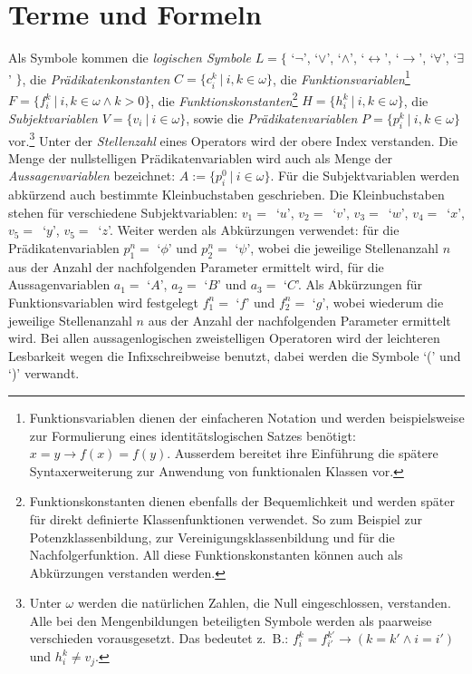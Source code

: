 \documentclass[a4paper,german,10pt,twoside]{book}
\theoremstyle{definition}
\theoremstyle{remark}
\begin{document}
\section{Terme und Formeln} \label{chapter3_section0} \hypertarget{chapter3_section0}{}
Als Symbole kommen die \emph{logischen Symbole} $L = \{$ \mbox{`$\neg$'}, \mbox{`$\vee$'}, \mbox{`$\wedge$'},             \mbox{`$\leftrightarrow$'}, \mbox{`$\rightarrow$'}, \mbox{`$\forall$'}, \mbox{`$\exists$'} $\}$, die 
\emph{Pr{\"a}dikatenkonstanten} $C = \{c^k_i~|~i, k \in \omega\}$, die 
\emph{Funktionsvariablen}\footnote{Funktionsvariablen dienen der einfacheren Notation und werden beispielsweise zur Formulierung eines identit{\"a}tslogischen Satzes ben{\"o}tigt: $x = y \rightarrow f(x) = f(y)$. Ausserdem bereitet ihre Einf{\"u}hrung die sp{\"a}tere Syntaxerweiterung zur Anwendung von funktionalen Klassen vor.} $F = \{f^k_i~|~i, k \in \omega \land k > 0\}$, die \emph{Funktionskonstanten}\footnote{Funktionskonstanten dienen ebenfalls der Bequemlichkeit und werden sp{\"a}ter f{\"u}r direkt 
definierte Klassenfunktionen verwendet. So zum Beispiel zur Potenzklassenbildung, zur Vereinigungsklassenbildung und f{\"u}r die
Nachfolgerfunktion. All diese Funktionskonstanten k{\"o}nnen auch als Abk{\"u}rzungen verstanden werden.}
$H = \{h^k_i~|~i, k \in \omega\}$, die \emph{Subjektvariablen} 
$V = \{v_i~|~i \in \omega\}$, sowie die \emph{Pr{\"a}dikatenvariablen}
$P = \{p^k_i~|~i, k \in \omega\}$ vor.\footnote{Unter $\omega$ werden die nat{\"u}rlichen Zahlen, die Null eingeschlossen, verstanden. Alle bei den Mengenbildungen beteiligten Symbole werden als paarweise verschieden vorausgesetzt. Das bedeutet z.~B.: $f^k_i = f^{k'}_{i'} \rightarrow (k = k' \land i = i')$ und $h^k_i \neq v_j$.} Unter der \emph{Stellenzahl} eines Operators wird der obere Index verstanden. Die Menge der nullstelligen Pr{\"a}dikatenvariablen wird auch als Menge der
\emph{Aussagenvariablen} bezeichnet: $A := \{p_i^0~|~i \in \omega \}$. 
F{\"u}r die Subjektvariablen werden abk{\"u}rzend auch bestimmte Kleinbuchstaben geschrieben. Die Kleinbuchstaben stehen f{\"u}r verschiedene Subjektvariablen: \mbox{$v_1 = $ `$u$'}, \mbox{$v_2 = $ `$v$'}, \mbox{$v_3 = $ `$w$'}, \mbox{$v_4 = $ `$x$'}, \mbox{$v_5 = $ `$y$'}, \mbox{$v_5 = $ `$z$'}. Weiter werden als Abk{\"u}rzungen verwendet: f{\"u}r die Pr{\"a}dikatenvariablen $p^n_1 = $ `$\phi$' und $p^n_2 = $ `$\psi$', wobei die jeweilige Stellenanzahl $n$ aus der Anzahl der nachfolgenden Parameter ermittelt wird, f{\"u}r die Aussagenvariablen $a_1 = $ `$A$', $a_2 = $ `$B$' und $a_3 = $ `$C$'. Als Abk{\"u}rzungen f{\"u}r Funktionsvariablen wird festgelegt $f^n_1 = $ `$f$' und $f^n_2 = $ `$g$', wobei wiederum die jeweilige Stellenanzahl $n$ aus der Anzahl der nachfolgenden Parameter ermittelt wird. Bei allen aussagenlogischen zwei\-stelligen Operatoren wird der leichteren Lesbarkeit wegen die Infixschreibweise benutzt, dabei werden die Symbole `(' und `)' verwandt. 
\end{document}
